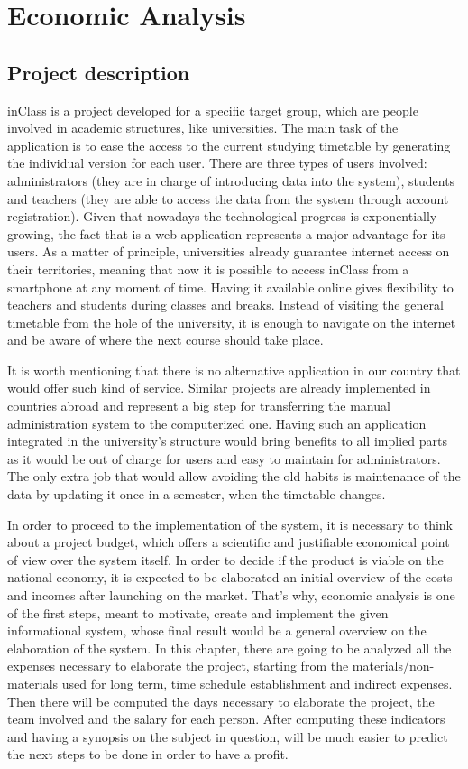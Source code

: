 \section{Economic Analysis}

\subsection{Project description}
inClass is a project developed for a specific target group, which are people involved in academic structures, like universities. The main task of the application is to ease the access to the current studying timetable by generating the individual version for each user.  There are three types of users involved: administrators (they are in charge of introducing data into the system), students and teachers (they are able to access the data from the system through account registration). Given that nowadays the technological progress is exponentially growing, the fact that  is a web application represents a major advantage for its users. As a matter of principle, universities already guarantee internet access on their territories, meaning that now it is possible to access inClass from a smartphone at any moment of time. Having it available online gives flexibility to teachers and students during classes and breaks. Instead of visiting the general timetable from the hole of the university, it is enough  to navigate on the internet and be aware of where the next course should take place.

It is worth mentioning that there is no alternative application in our country that would offer such kind of service. Similar projects are already implemented in countries abroad and represent a big step for transferring the manual administration system to the computerized one. Having such an application integrated in the university's structure would bring benefits to all implied parts as it would be out of charge for users and easy to maintain for administrators. The only extra job that would allow avoiding the old habits is maintenance of the data by updating it once in a semester, when the timetable changes.
 
In order to proceed to  the implementation of the system, it is necessary to think about a project budget, which offers a scientific and justifiable economical point of view over the system itself. In order to decide if the product is viable on the national economy, it is expected to be elaborated an initial overview of the costs and incomes after launching on the market. That's why, economic analysis is one of the first steps, meant to motivate, create and implement the given informational system, whose final result would be a general overview on the elaboration of the system. In this chapter, there are going to be analyzed all the expenses necessary to elaborate the project, starting from the materials/non-materials used for long term, time schedule establishment and indirect expenses. Then there will be computed the days necessary to elaborate the project, the team involved and the salary for each person. After computing these indicators and having a synopsis on the subject in question, will be much easier to predict the next steps to be done in order to have a profit.

